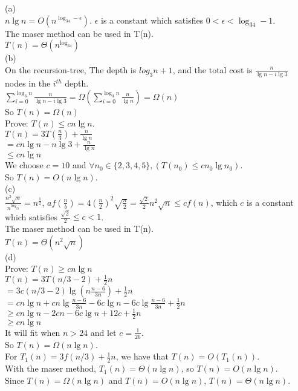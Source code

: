 \documentclass[a4paper, justified]{tufte-handout}
\begin{document}
\begin{solution}
\noindent(a)\\
$n\lg n=O(n^{\log_34-\epsilon})$. $\epsilon$ is a constant which satisfies $0<\epsilon<\log_34-1$.\\
The maser method can be used in T(n).\\
$T(n)=\Theta(n^{\log_34})$\\

\noindent(b)\\
On the  recursion-tree, The depth is  $log_3{n}+1$, and the total cost is  $\frac{n}{\lg n-i\lg 3}$ nodes in the $i^{th}$ depth.\\  
$\sum\limits_{i=0}^{\log_3n} \frac{n}{\lg n-i\lg 3}=\Omega(\sum\limits_{i=0}^{\log_3n} \frac{n}{\lg n})=\Omega(n)$\\
So $T(n)=\Omega(n)$\\
Prove: $T(n)\leq cn\lg n$.\\
$T(n)=3T(\frac{n}{3})+\frac{n}{\lg n}$\\
\hspace*{2.5em}$=cn\lg n-n\lg 3+\frac{n}{\lg n}$\\
\hspace*{2.5em}$\leq cn\lg n$\\
We choose $c=10$ and $\forall n_0\in\{2,3,4,5\},(T(n_0)\leq cn_0\lg n_0)$.\\
So $T(n)=O(n\lg n)$.\\

\noindent(c)\\
$\frac{n^2\sqrt{n}}{n^{log_24}}=n^{\frac{1}{2}}$, $af(\frac{n}{b})=4(\frac{n}{2})^2\sqrt{\frac{n}{2}}=\frac{\sqrt{2}}{2}n^2\sqrt{n}\leq cf(n)$, which $c$ is a constant which satisfies $\frac{\sqrt{2}}{2}\leq c<1$.\\
The maser method can be used in T(n).\\
$T(n)=\Theta(n^2\sqrt{n})$\\

\noindent(d)\\
Prove: $T(n)\geq cn\lg n$\\
$T(n)=3 T(n / 3-2)+\frac{1}{2}n$\\
\hspace*{2.5em}$=3c(n/3-2)\lg(n\frac{n-6}{3n})+\frac{1}{2}n$\\
\hspace*{2.5em}$=cn\lg n+ cn \lg\frac{n-6}{3n}-6c\lg n-6c\lg\frac{n-6}{3n}+\frac{1}{2}n$\\
\hspace*{2.5em}$\geq cn\lg n-2cn-6c\lg n+12c+\frac{1}{2}n$\\
\hspace*{2.5em}$\geq cn\lg n$\\
It will fit when $n>24$ and let $c=\frac{1}{26}$.\\
So $T(n)=\Omega(n\lg n)$.\\
For $T_1(n)=3f(n/3)+\frac{1}{2}n$, we have that $T(n)=O(T_1(n))$.\\
With the maser method, $T_1(n)=\Theta(n\lg n)$, so $T(n)=O(n\lg n)$.\\
Since $T(n)=\Omega(n\lg n)$ and $T(n)=O(n\lg n)$, $T(n)=\Theta(n\lg n)$.\\


\end{solution}
\end{document}
